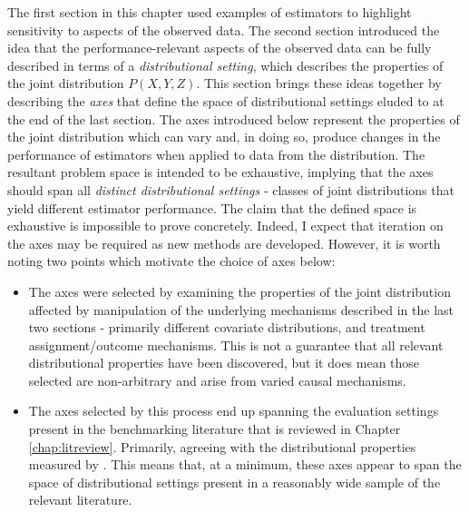 \documentclass[../main.tex]{subfiles}
\begin{document}
The first section in this chapter used examples of estimators to highlight sensitivity to aspects of the observed data. The second section introduced the idea that the performance-relevant aspects of the observed data can be fully described in terms of a \textit{distributional setting}, which describes the properties of the joint distribution  \( P \left( X, Y, Z \right)  \). This section brings these ideas together by describing the \textit{axes} that define the space of distributional settings eluded to at the end of the last section. The axes introduced below represent the properties of the joint distribution which can vary and, in doing so, produce changes in the performance of estimators when applied to data from the distribution. The resultant problem space is intended to be exhaustive, implying that the axes should span all \textit{distinct distributional settings} - classes of joint distributions that yield different estimator performance. The claim that the defined space is exhaustive is impossible to prove concretely. Indeed, I expect that iteration on the axes may be required as new methods are developed. However, it is worth noting two points which motivate the choice of axes below:\par


\vspace{\baselineskip}
\begin{itemize}
    \item The axes were selected by examining the properties of the joint distribution affected by manipulation of the underlying mechanisms described in the last two sections - primarily different covariate distributions, and treatment assignment/outcome mechanisms. This is not a guarantee that all relevant distributional properties have been discovered, but it does mean those selected are non-arbitrary and arise from varied causal mechanisms.\par

\vspace{\baselineskip}
    \item The axes selected by this process end up spanning the evaluation settings present in the benchmarking literature that is reviewed in Chapter \ref{chap:litreview}. Primarily, agreeing with the distributional properties measured by \textcite{Dorie2019Automated1}. This means that, at a minimum, these axes appear to span the space of distributional settings present in a reasonably wide sample of the relevant literature.
\end{itemize}\par
\end{document}
